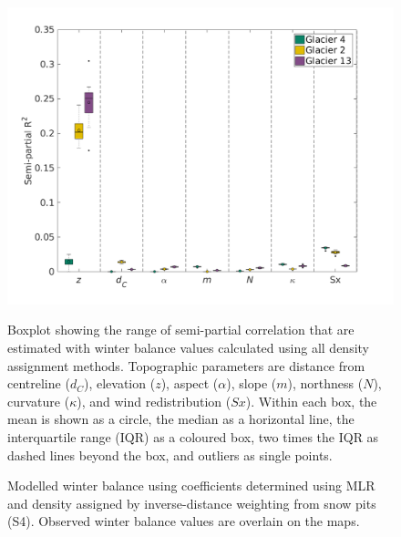 \documentclass{sfuthesis}
\newcommand{\params}{Topographic parameters are distance from centreline ($d_C$), elevation ($z$), aspect ($\alpha$), slope ($m$), northness ($N$), curvature ($\kappa$), and wind redistribution ($Sx$). }
\newcommand{\boxplot}{Within each box, the mean is shown as a circle, the median as a horizontal line, the interquartile range (IQR) as a coloured box, two times the IQR as dashed lines beyond the box, and outliers as single points. }
\newcommand{\swedots}{Observed winter balance values are overlain on the maps. }
\begin{document}
\begin{figure}[H]
	\centering
	\includegraphics[width =1 \textwidth]{MLRsemiR2_DensityOpts.png}\\
	\caption{Boxplot showing the range of semi-partial correlation that are estimated with winter balance values calculated using all density assignment methods. \params \boxplot }
	\label{fig:MLRsemiR2_densityOptions}
\end{figure} 

\begin{figure}[H]
	\caption{Modelled winter balance using coefficients determined using MLR and density assigned by inverse-distance weighting from snow pits (S4). \swedots}
	\label{fig:MLRmodelledSWE}
\end{figure}
\end{document}
